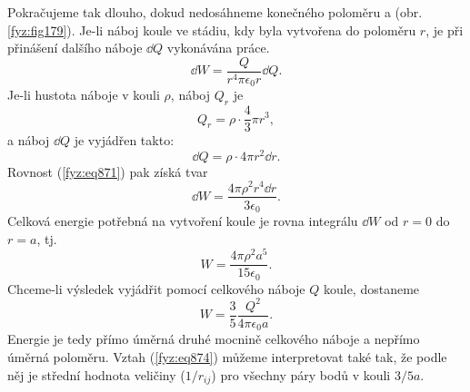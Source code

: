     Pokračujeme tak dlouho, dokud nedosáhneme konečného poloměru a (obr. \ref{fyz:fig179}). Je-li
    náboj koule ve stádiu, kdy byla vytvořena do poloměru \(r\), je při přinášení dalšího náboje
    \(\dd{Q}\) vykonávána práce.
    \begin{equation}\label{fyz:eq871}
      \dd{W}=\dfrac{Q}{r^4πϵ_0r}\dd{Q}.
    \end{equation}
    Je-li hustota náboje v kouli \(ρ\), náboj \(Q_r\) je
    \begin{equation*}
      Q_r=ρ\cdot\dfrac{4}{3}πr^3,
    \end{equation*}
    a náboj \(\dd{Q}\) je vyjádřen takto:
    \begin{equation*}
      \dd{Q}=ρ⋅4πr^2\dd{r}.
    \end{equation*}
    Rovnost (\ref{fyz:eq871}) pak získá tvar
    \begin{equation}\label{fyz:eq872}
      \dd{W}=\dfrac{4πρ^2r^4\dd{r}}{3ϵ_0}.
    \end{equation}
    Celková energie potřebná na vytvoření koule je rovna integrálu \(\dd{W}\) od \(r = 0\) do \(r =
    a\), tj.
    \begin{equation}\label{fyz:eq873}
      W=\dfrac{4πρ^2a^5}{15ϵ_0}.
    \end{equation}
    Chceme-li výsledek vyjádřit pomocí celkového náboje \(Q\) koule, dostaneme
    \begin{equation}\label{fyz:eq874}
      W=\dfrac{3}{5}\dfrac{Q^2}{4πϵ_0a}.
    \end{equation}
    Energie je tedy přímo úměrná druhé mocnině celkového náboje a nepřímo úměrná poloměru. Vztah
    (\ref{fyz:eq874}) můžeme interpretovat také tak, že podle něj je střední hodnota veličiny
    (\(1/r_{ij}\)) pro všechny páry bodů v kouli \(3/5 a\).


